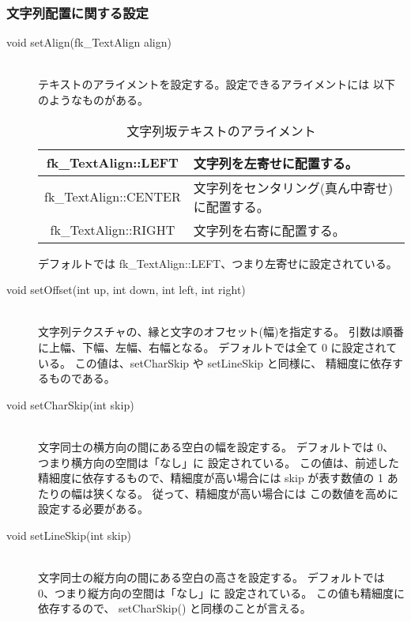 \subsubsection{文字列配置に関する設定}
\begin{description}
\item[void setAlign(fk\_TextAlign align)] ~ \\
	テキストのアライメントを設定する。設定できるアライメントには
	以下のようなものがある。
	\begin{table}[H]
	\caption{文字列坂テキストのアライメント}
	\label{tbl:textAlign}
	\begin{center}
	\begin{tabular}{|c|l|}
	\hline
	fk\_TextAlign::LEFT & 文字列を左寄せに配置する。\\ \hline
	fk\_TextAlign::CENTER &
	文字列をセンタリング(真ん中寄せ)に配置する。\\ \hline
	fk\_TextAlign::RIGHT & 文字列を右寄に配置する。\\ \hline
	\end{tabular}
	\end{center}
	\end{table}
	デフォルトでは fk\_TextAlign::LEFT、つまり左寄せに設定されている。\\

\item[void setOffset(int up, int down, int left, int right)] ~ \\
	文字列テクスチャの、縁と文字のオフセット(幅)を指定する。
	引数は順番に上幅、下幅、左幅、右幅となる。
	デフォルトでは全て 0 に設定されている。
	この値は、setCharSkip や setLineSkip と同様に、
	精細度に依存するものである。\\

\item[void setCharSkip(int skip)] ~ \\
	文字同士の横方向の間にある空白の幅を設定する。
	デフォルトでは 0、つまり横方向の空間は「なし」に
	設定されている。
	この値は、前述した精細度に依存するもので、精細度が高い場合には
	skip が表す数値の 1 あたりの幅は狭くなる。
	従って、精細度が高い場合には
	この数値を高めに設定する必要がある。\\

\item[void setLineSkip(int skip)] ~ \\
	文字同士の縦方向の間にある空白の高さを設定する。
	デフォルトでは 0、つまり縦方向の空間は「なし」に
	設定されている。
	この値も精細度に依存するので、
	setCharSkip() と同様のことが言える。\\


\end{description}
